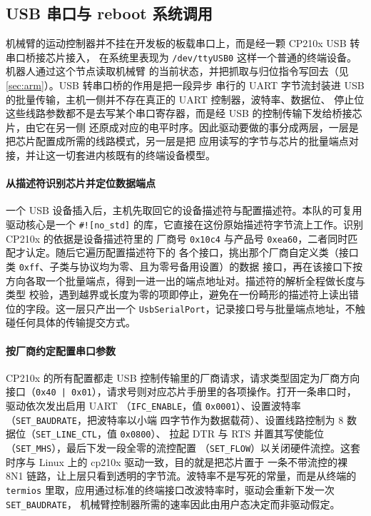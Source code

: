 \subsection{USB 串口与 reboot 系统调用}\label{sec:serialreboot}

机械臂的运动控制器并不挂在开发板的板载串口上，而是经一颗 CP210x USB 转串口桥接芯片接入，
在系统里表现为 \texttt{/dev/ttyUSB0} 这样一个普通的终端设备。机器人通过这个节点读取机械臂
的当前状态，并把抓取与归位指令写回去（见 \ref{sec:arm}）。USB 转串口桥的作用是把一段异步
串行的 UART 字节流封装进 USB 的批量传输，主机一侧并不存在真正的 UART 控制器，波特率、数据位、
停止位这些线路参数都不是去写某个串口寄存器，而是经 USB 的控制传输下发给桥接芯片，由它在另一侧
还原成对应的电平时序。因此驱动要做的事分成两层，一层是把芯片配置成所需的线路模式，另一层是把
应用读写的字节与芯片的批量端点对接，并让这一切套进内核既有的终端设备模型。

\paragraph{从描述符识别芯片并定位数据端点}
一个 USB 设备插入后，主机先取回它的设备描述符与配置描述符。本队的可复用驱动核心是一个
\texttt{\#![no\_std]} 的库，它直接在这份原始描述符字节流上工作。识别 CP210x 的依据是设备描述符里的
厂商号 \texttt{0x10c4} 与产品号 \texttt{0xea60}，二者同时匹配才认定。随后它遍历配置描述符下的
各个接口，挑出那个厂商自定义类（接口类 \texttt{0xff}、子类与协议均为零、且为零号备用设置）的数据
接口，再在该接口下按方向各取一个批量端点，得到一进一出的端点地址对。描述符的解析全程做长度与类型
校验，遇到越界或长度为零的项即停止，避免在一份畸形的描述符上读出错位的字段。这一层只产出一个
\texttt{UsbSerialPort}，记录接口号与批量端点地址，不触碰任何具体的传输提交方式。

\paragraph{按厂商约定配置串口参数}
CP210x 的所有配置都走 USB 控制传输里的厂商请求，请求类型固定为厂商方向接口（\texttt{0x40 |
0x01}），请求号则对应芯片手册里的各项操作。打开一条串口时，驱动依次发出启用 UART
（\texttt{IFC\_ENABLE}，值 \texttt{0x0001}）、设置波特率（\texttt{SET\_BAUDRATE}，把波特率以小端
四字节作为数据载荷）、设置线路控制为 8 数据位（\texttt{SET\_LINE\_CTL}，值 \texttt{0x0800}）、
拉起 DTR 与 RTS 并置其写使能位（\texttt{SET\_MHS}），最后下发一段全零的流控配置
（\texttt{SET\_FLOW}）以关闭硬件流控。这套时序与 Linux 上的 cp210x 驱动一致，目的就是把芯片置于
一条不带流控的裸 8N1 链路，让上层只看到透明的字节流。波特率不是写死的常量，而是从终端的
\texttt{termios} 里取，应用通过标准的终端接口改波特率时，驱动会重新下发一次 \texttt{SET\_BAUDRATE}，
机械臂控制器所需的速率因此由用户态决定而非驱动假定。

